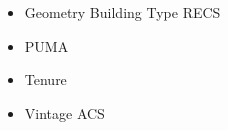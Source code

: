 \begin{itemize}
\item Geometry Building Type RECS
\item PUMA
\item Tenure
\item Vintage ACS
\end{itemize}
